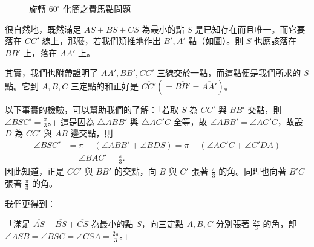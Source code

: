 \begin{figure}[H]
\centering
{}
\caption{旋轉 $60^\circ$ 化簡之費馬點問題}
\label{fig:5-25}
\end{figure}

很自然地，既然滿足 $\overline{AS} + \overline{BS} + \overline{CS}$ 為最小的點 $S$ 是已知存在而且唯一。而它要落在 $CC'$ 線上，那麼，若我們類推地作出 $B', A'$ 點（如圖）。則 $S$ 也應該落在 $BB'$ 上，落在 $AA'$ 上。

其實，我們也附帶證明了 $AA', BB', CC'$ 三線交於一點，而這點便是我們所求的 $S$ 點。它到 $A, B, C$ 三定點的和正好是 $\overline{CC'} (= \overline{BB'} = \overline{AA'})$。

以下事實的檢驗，可以幫助我們的了解：「若取 $S$ 為 $CC'$ 與 $BB'$ 交點，則 $\angle BSC' = \frac{\pi}{3}$。」這是因為 $\triangle ABB'$ 與 $\triangle AC'C$ 全等，故 $\angle ABB' = \angle AC'C$，故設 $D$ 為 $CC'$ 與 $AB$ 邊交點，則
\begin{align*}
\angle BSC' &= \pi - (\angle ABB' + \angle BDS) = \pi - (\angle AC'C + \angle C'DA) \\
&= \angle BAC' = \frac{\pi}{3}.
\end{align*}
因此知道，正是 $CC'$ 與 $BB'$ 的交點，向 $B$ 與 $C'$ 張著 $\frac{\pi}{3}$ 的角。同理也向著 $B'C$ 張著 $\frac{\pi}{3}$ 的角。

我們更得到：
\begin{center}
\parbox{0.92\textwidth}{「滿足 $\overline{AS} + \overline{BS} + \overline{CS}$ 為最小的點 $S$，向三定點 $A, B, C$ 分別張著 $\frac{2\pi}{3}$ 的角，卽 $\angle ASB = \angle BSC = \angle CSA = \frac{2\pi}{3}$。」}
\end{center}

